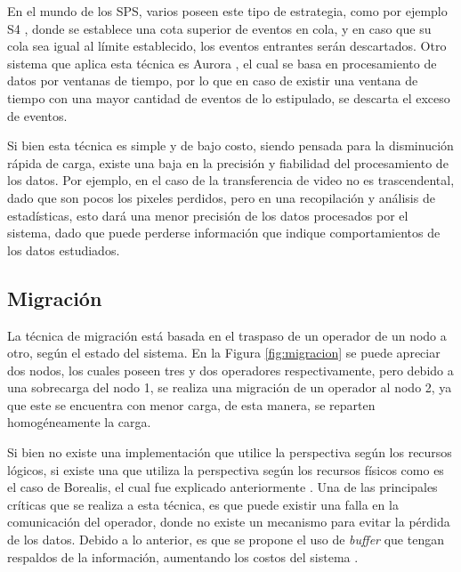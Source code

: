 En el mundo de los SPS, varios poseen este tipo de estrategia, como por ejemplo S4 \citep{s4}, donde se establece una cota superior de eventos en cola, y en caso que su cola sea igual al límite establecido, los eventos entrantes serán descartados. Otro sistema que aplica esta técnica es Aurora \citep{aurora}, el cual se basa en procesamiento de datos por ventanas de tiempo, por lo que en caso de existir una ventana de tiempo con una mayor cantidad de eventos de lo estipulado, se descarta el exceso de eventos.

Si bien esta técnica es simple y de bajo costo, siendo pensada para la disminución rápida de carga, existe una baja en la precisión y fiabilidad del procesamiento de los datos. Por ejemplo, en el caso de la transferencia de video no es trascendental, dado que son pocos los pixeles perdidos, pero en una recopilación y análisis de estadísticas, esto dará una menor precisión de los datos procesados por el sistema, dado que puede perderse información que indique comportamientos de los datos estudiados.

\subsection{Migración}
\label{sec:migracionBC}

La técnica de migración está basada en el traspaso de un operador de un nodo a otro, según el estado del sistema. En la Figura \ref{fig:migracion} se puede apreciar dos nodos, los cuales poseen tres y dos operadores respectivamente, pero debido a una sobrecarga del nodo 1, se realiza una migración de un operador al nodo 2, ya que este se encuentra con menor carga, de esta manera, se reparten homogéneamente la carga.

Si bien no existe una implementación que utilice la perspectiva según los recursos lógicos, si existe una que utiliza la perspectiva según los recursos físicos como es el caso de Borealis, el cual fue explicado anteriormente \citep{XingZH05}. Una de las principales críticas que se realiza a esta técnica, es que puede existir una falla en la comunicación del operador, donde no existe un mecanismo para evitar la pérdida de los datos. Debido a lo anterior, es que se propone el uso de \textit{buffer} que tengan respaldos de la información, aumentando los costos del sistema \citep{PittauACA07}.

